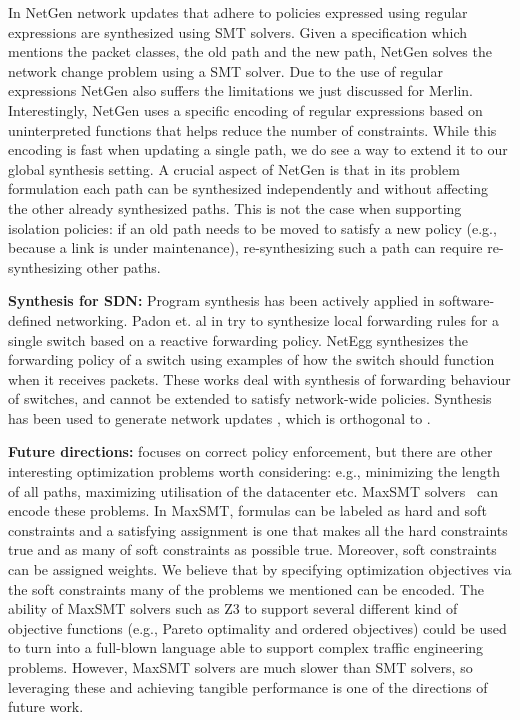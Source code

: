In NetGen network updates that adhere to policies expressed using
regular expressions are synthesized using SMT solvers.  Given a
specification which mentions the packet classes, the old path and the
new path, NetGen solves the network change problem using a SMT solver.
Due to the use of regular expressions NetGen also suffers the
limitations we just discussed for Merlin.  Interestingly, NetGen uses
a specific encoding of regular expressions based on uninterpreted
functions that helps reduce the number of constraints. While this
encoding is fast when updating a single path, we do see a way to
extend it to our global synthesis setting.  A crucial aspect of NetGen
is that in its problem formulation each path can be synthesized
independently and without affecting the other already synthesized
paths.  This is not the case when supporting isolation policies: if an
old path needs to be moved to satisfy a new policy (e.g., because a
link is under maintenance), re-synthesizing such a path can require
re-synthesizing other paths. 

\noindent
{\bf Synthesis for SDN:}
Program synthesis has been actively applied in software-defined
networking. Padon et. al in \cite{decentralize} try to synthesize
local forwarding rules for a single switch based on a reactive
forwarding policy.  NetEgg \cite{netegg} synthesizes the forwarding
policy of a switch using examples of how the switch should function
when it receives packets. These works deal with synthesis of
forwarding behaviour of switches, and cannot be extended to satisfy
network-wide policies.  Synthesis has been used to generate network
updates \cite{updates, customconsistency}, which is orthogonal to \Name.


\noindent
{\bf Future directions:}
\Name focuses on correct policy enforcement, but there are other
interesting optimization problems worth considering: e.g., minimizing
the length of all paths, maximizing utilisation of the datacenter
etc. MaxSMT solvers~\cite{z3maxSMT} can encode these problems.  In
MaxSMT, formulas can be labeled as hard and soft constraints and a
satisfying assignment is one that makes all the hard constraints true
and as many of soft constraints as possible true.  Moreover, soft
constraints can be assigned weights.  We believe that by specifying
optimization objectives via the soft constraints many of the problems
we mentioned can be encoded.  The ability of MaxSMT solvers such as Z3
to support several different kind of objective functions (e.g., Pareto
optimality and ordered objectives) could be used to turn \Name into a
full-blown language able to support complex traffic engineering
problems.  However, MaxSMT solvers are much slower than SMT solvers,
so leveraging these and achieving tangible performance is one of the
directions of future work.
 
